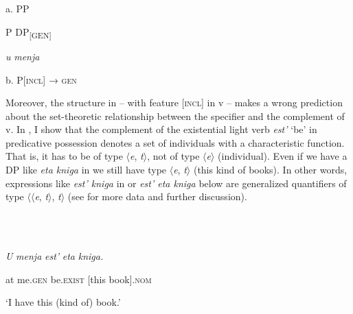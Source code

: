 \documentclass[output=paper,colorlinks,citecolor=brown]{./langscibook}
\begin{document}
\ea%
    \label{ex:tsedryk:8}
    \gll\\
        \\
    \glt
    \z

          a.  PP

    P  DP\textsubscript{[GEN]}

    \textit{u}      \textit{menja} 

  b.  P[\textsc{incl}] → \textsc{gen}

Moreover, the structure in  – with feature [\textsc{incl}] in v – makes a wrong prediction about the set-theoretic relationship between the specifier and the complement of v. In \citet{TsedrykInPress}, I show that the complement of the existential light verb \textit{est’} ‘be’ in predicative possession denotes a set of individuals with a characteristic function. That is, it has to be of type ${\langle}$\textit{e}, \textit{t}${\rangle}$, not of type ${\langle}$\textit{e}${\rangle}$ (individual). Even if we have a DP like \textit{eta kniga} in  we still have type ${\langle}$\textit{e}, \textit{t}${\rangle}$ (this kind of books). In other words, expressions like \textit{est’ kniga} in  or \textit{est’ eta kniga} below are generalized quantifiers of type ${\langle}{\langle}$\textit{e}, \textit{t}${\rangle}$, \textit{t}${\rangle}$ (see \citealt{TsedrykInPress} for more data and further discussion). 

\ea%
    \label{ex:tsedryk:9}
    \gll\\
        \\
    \glt
    \z

          \textit{U} \textit{menja}     \textit{est’}           \textit{eta} \textit{kniga.}

  at me.\textsc{gen}   be.\textsc{exist}   [this book].\textsc{nom}

  ‘I have this (kind of) book.’
\end{document}
